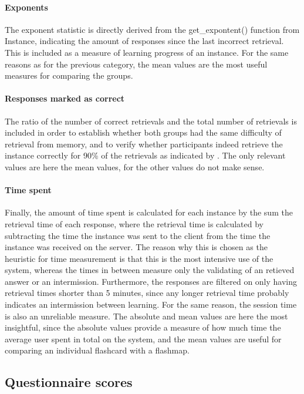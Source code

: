 \paragraph{Exponents} The exponent statistic is directly derived from the get\_expontent() function from Instance, indicating the amount of responses since the last incorrect retrieval. This is included as a measure of learning progress of an instance. For the same reasons as for the previous category, the mean values are the most useful measures for comparing the groups.

\paragraph{Responses marked as correct} The ratio of the number of correct retrievals and the total number of retrievals is included in order to establish whether both groups had the same difficulty of retrieval from memory, and to verify whether participants indeed retrieve the instance correctly for 90\% of the retrievals as indicated by . The only relevant values are here the mean values, for the other values do not make sense.

\paragraph{Time spent} Finally, the amount of time spent is calculated for each instance by the sum the retrieval time of each response, where the retrieval time is calculated by subtracting the time the instance was sent to the client from the time the instance was received on the server. The reason why this is chosen as the heuristic for time measurement is that this is the most intensive use of the system, whereas the times in between measure only the validating of an retieved answer or an intermission. Furthermore, the responses are filtered on only having retrieval times shorter than 5 minutes, since any longer retrieval time probably indicates an intermission between learning. For the same reason, the session time is also an unreliable measure. The absolute and mean values are here the most insightful, since the absolute values provide a measure of how much time the average user spent in total on the system, and the mean values are useful for comparing an individual flashcard with a flashmap. 

\subsection{Questionnaire scores}

